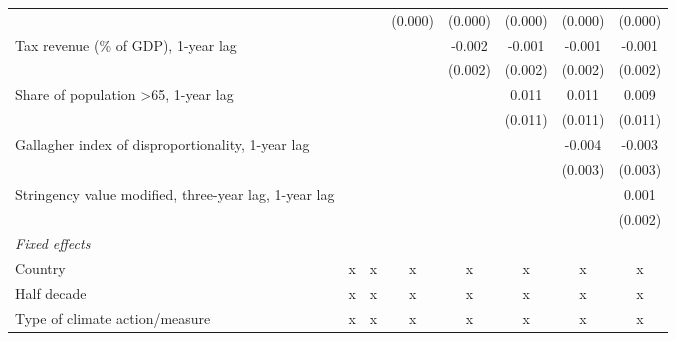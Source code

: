 \begin{tabular}{lccccccc}
                                                                     &               &               & (0.000)       & (0.000)       & (0.000)       & (0.000)       & (0.000)\\   
   Tax revenue (\% of GDP), 1-year lag                               &               &               &               & -0.002        & -0.001        & -0.001        & -0.001\\   
                                                                     &               &               &               & (0.002)       & (0.002)       & (0.002)       & (0.002)\\   
   Share of population >65, 1-year lag                               &               &               &               &               & 0.011         & 0.011         & 0.009\\   
                                                                     &               &               &               &               & (0.011)       & (0.011)       & (0.011)\\   
   Gallagher index of disproportionality, 1-year lag                 &               &               &               &               &               & -0.004        & -0.003\\   
                                                                     &               &               &               &               &               & (0.003)       & (0.003)\\   
   Stringency value modified, three-year lag, 1-year lag             &               &               &               &               &               &               & 0.001\\   
                                                                     &               &               &               &               &               &               & (0.002)\\   
   \emph{Fixed effects}\\
   Country                                                           & x             & x             & x             & x             & x             & x             & x\\  
   Half decade                                                       & x             & x             & x             & x             & x             & x             & x\\  
   Type of climate action/measure                                    & x             & x             & x             & x             & x             & x             & x\\  

\end{tabular}
